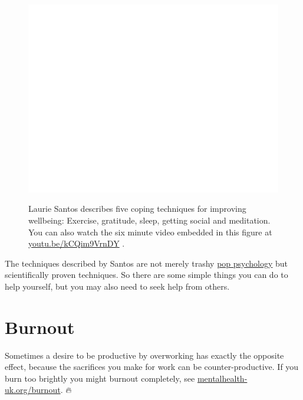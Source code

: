 \documentclass[
]{book}
\begin{document}
\begin{figure}

{\centering \href{https://www.youtube.com/embed/kCQim9VrnDY}{\includegraphics[width=0.99\linewidth]{cdyf_files/figure-latex/laurie-fig-1} }

}

\caption{Laurie Santos describes five coping techniques for improving wellbeing: Exercise, gratitude, sleep, getting social and meditation. You can also watch the six minute video embedded in this figure at \href{https://youtu.be/kCQim9VrnDY}{youtu.be/kCQim9VrnDY} \citep{youtube-santos}.}\label{fig:laurie-fig}
\end{figure}



The techniques described by Santos are not merely trashy \href{https://en.wikipedia.org/wiki/Popular_psychology}{pop psychology} but scientifically proven techniques. \citep{yaden} So there are some simple things you can do to help yourself, but you may also need to seek help from others.

\hypertarget{burnout}{%
\section{Burnout}\label{burnout}}

Sometimes a desire to be productive by overworking has exactly the opposite effect, because the sacrifices you make for work can be counter-productive. If you burn too brightly you might burnout completely, see \href{https://mentalhealth-uk.org/burnout/}{mentalhealth-uk.org/burnout}. 🔥
\end{document}
